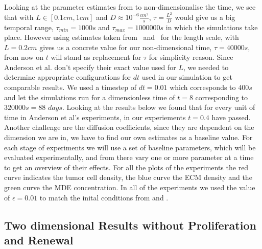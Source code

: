 Looking at the parameter estimates from \cite{anderson_mathematical_2000} to non-dimensionalise the time, we see that with $L \in [0.1cm,1cm]$ and $D\approx 10^{-6}\frac{cm^2}{s}$, $\tau = \frac{L^2}{D}$ would give us a big temporal range, $\tau_{min} = 1000s$ and $\tau_{max} = 1000000s$ in which the simulations take place. However using estimates taken from~\cite{STEPHANOU200696} and~\cite{franssen_mathematical_2019} for the length scale, with $L=0.2cm$ gives us a concrete value for our non-dimensional time, $\tau=40000s$, from now on $t$ will stand as replacement for $\tau$ for simplicity reason.\newline 
Since Anderson et al. don't specify their exact value used for $L$, we needed to determine appropriate configurations for $dt$ used in our simulation to get comparable results. We used a timestep of $dt=0.01$ which corresponds to $400s$ and let the simulations run for a dimensionless time of $t=8$ corresponding to $320000s=88$ $days$. Looking at the results below we found that for every unit of time in Anderson et al's experiments, in our experiements $t=0.4$ have passed.\newline 
Another challenge are the diffusion coefficients, since they are dependent on the dimension we are in, we have to find our own estimates as a baseline value. \newline 
For each stage of experiments we will use a set of baseline parameters, which will be evaluated experimentally, and from there vary one or more parameter at a time to get an overview of their effects. \newline
For all the plots of the experiments the red curve indicates the tumor cell density, the blue curve the ECM density and the green curve the MDE concentration. In all of the experiments we used the value of $\epsilon = 0.01$ to match the inital conditions from \cite{anderson_mathematical_2000} and \cite{Kolev2010}. \newline 

\subsection{Two dimensional Results without Proliferation and Renewal}
\label{sec:2D_without_proliferation}

